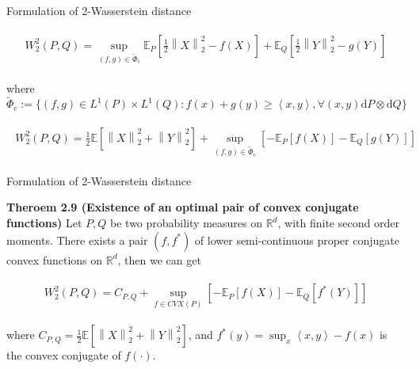 \documentclass{beamer}		%
\newcommand{\dd}{\mathrm{d}}
\begin{document}
\begin{frame}{Formulation of 2-Wasserstein distance}

\begin{eqnarray}\label{eq:W2dual2}
\begin{aligned}
W_2^2 (P, Q) = \sup_{(f,g) \in \tilde{\Phi}_c} \mathbb{E}_P \left[\frac{1}{2} \left\| X\right\|_2^2-f(X) \right] + \mathbb{E}_Q \left[ \frac{1}{2} \left\| Y\right\|_2^2-g(Y) \right]
\end{aligned}    
\end{eqnarray}

where $\tilde{\Phi}_c := \{ (f,g) \in L^1(P) \times L^1(Q): f(x)+g(y) \ge \left \langle x,y \right \rangle, \forall (x,y) \dd P \otimes \dd Q \}$

\pause

\begin{eqnarray*}
\begin{aligned}
W_2^2 (P, Q)=\frac{1}{2} \mathbb{E}[\left\|X \right\|_2^2 + \left\|Y \right\|_2^2] + \sup_{(f,g) \in \tilde{\Phi}_c} \left[- \mathbb{E}_P[f(X)] - \mathbb{E}_Q[g(Y)] \right]
\end{aligned}    
\end{eqnarray*}


    
\end{frame}







\begin{frame}{Formulation of 2-Wasserstein distance}

\textbf{Theroem 2.9 (Existence of an optimal pair of convex conjugate functions)  } Let $P, Q$ be two probability measures on $\mathbb{R}^d$, with finite second order moments. There exists a pair $(f, f^*)$ of lower semi-continuous proper conjugate convex functions on $\mathbb{R}^d$, then we can get

\begin{eqnarray}
\begin{aligned}
W_2^2 (P, Q) = C_{P,Q} + \sup_{f \in CVX(P)} \left[ - \mathbb{E}_P[f(X)] - \mathbb{E}_Q[f^*(Y)] \right]
\end{aligned}    
\end{eqnarray}

where $C_{P,Q} = \frac{1}{2} \mathbb{E}[\left\|X \right\|_2^2 + \left\|Y \right\|_2^2] $, and $f^*(y)=\sup_x \left \langle x,y \right \rangle - f(x)$ is the convex conjugate of $f(\cdot)$.

\end{frame}
\end{document}
